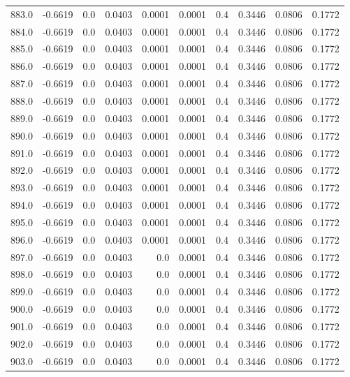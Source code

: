 \begin{longtable}{lrrrrrrrrr}
883.0 & -0.6619 & 0.0 & 0.0403 & 0.0001 & 0.0001 & 0.4 & 0.3446 & 0.0806 & 0.1772 \\
884.0 & -0.6619 & 0.0 & 0.0403 & 0.0001 & 0.0001 & 0.4 & 0.3446 & 0.0806 & 0.1772 \\
885.0 & -0.6619 & 0.0 & 0.0403 & 0.0001 & 0.0001 & 0.4 & 0.3446 & 0.0806 & 0.1772 \\
886.0 & -0.6619 & 0.0 & 0.0403 & 0.0001 & 0.0001 & 0.4 & 0.3446 & 0.0806 & 0.1772 \\
887.0 & -0.6619 & 0.0 & 0.0403 & 0.0001 & 0.0001 & 0.4 & 0.3446 & 0.0806 & 0.1772 \\
888.0 & -0.6619 & 0.0 & 0.0403 & 0.0001 & 0.0001 & 0.4 & 0.3446 & 0.0806 & 0.1772 \\
889.0 & -0.6619 & 0.0 & 0.0403 & 0.0001 & 0.0001 & 0.4 & 0.3446 & 0.0806 & 0.1772 \\
890.0 & -0.6619 & 0.0 & 0.0403 & 0.0001 & 0.0001 & 0.4 & 0.3446 & 0.0806 & 0.1772 \\
891.0 & -0.6619 & 0.0 & 0.0403 & 0.0001 & 0.0001 & 0.4 & 0.3446 & 0.0806 & 0.1772 \\
892.0 & -0.6619 & 0.0 & 0.0403 & 0.0001 & 0.0001 & 0.4 & 0.3446 & 0.0806 & 0.1772 \\
893.0 & -0.6619 & 0.0 & 0.0403 & 0.0001 & 0.0001 & 0.4 & 0.3446 & 0.0806 & 0.1772 \\
894.0 & -0.6619 & 0.0 & 0.0403 & 0.0001 & 0.0001 & 0.4 & 0.3446 & 0.0806 & 0.1772 \\
895.0 & -0.6619 & 0.0 & 0.0403 & 0.0001 & 0.0001 & 0.4 & 0.3446 & 0.0806 & 0.1772 \\
896.0 & -0.6619 & 0.0 & 0.0403 & 0.0001 & 0.0001 & 0.4 & 0.3446 & 0.0806 & 0.1772 \\
897.0 & -0.6619 & 0.0 & 0.0403 & 0.0 & 0.0001 & 0.4 & 0.3446 & 0.0806 & 0.1772 \\
898.0 & -0.6619 & 0.0 & 0.0403 & 0.0 & 0.0001 & 0.4 & 0.3446 & 0.0806 & 0.1772 \\
899.0 & -0.6619 & 0.0 & 0.0403 & 0.0 & 0.0001 & 0.4 & 0.3446 & 0.0806 & 0.1772 \\
900.0 & -0.6619 & 0.0 & 0.0403 & 0.0 & 0.0001 & 0.4 & 0.3446 & 0.0806 & 0.1772 \\
901.0 & -0.6619 & 0.0 & 0.0403 & 0.0 & 0.0001 & 0.4 & 0.3446 & 0.0806 & 0.1772 \\
902.0 & -0.6619 & 0.0 & 0.0403 & 0.0 & 0.0001 & 0.4 & 0.3446 & 0.0806 & 0.1772 \\
903.0 & -0.6619 & 0.0 & 0.0403 & 0.0 & 0.0001 & 0.4 & 0.3446 & 0.0806 & 0.1772 \\

\end{longtable}
